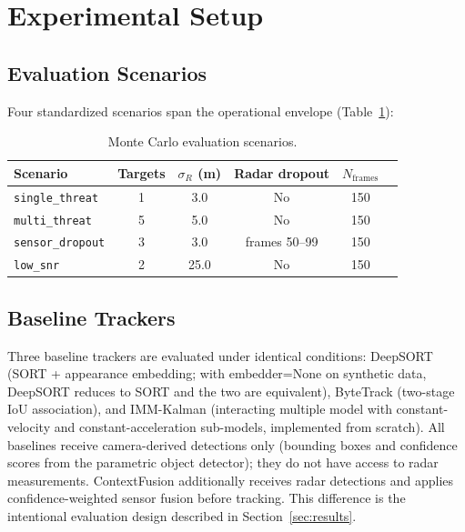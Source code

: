 \documentclass[drones,article,submit,pdftex]{Definitions/mdpi}
\begin{document}
\section{Experimental Setup}
\label{sec:exp}

\subsection{Evaluation Scenarios}

Four standardized scenarios span the operational envelope (Table~\ref{tab:scenarios}):

\begin{table}[ht]
  \centering
  \caption{Monte Carlo evaluation scenarios.}
  \label{tab:scenarios}
  \begin{tabular}{lccccc}
    \toprule
    Scenario & Targets & $\sigma_R$ (m) & Radar dropout & $N_\text{frames}$ \\
    \midrule
    \texttt{single\_threat}  & 1 & 3.0  & No  & 150 \\
    \texttt{multi\_threat}   & 5 & 5.0  & No  & 150 \\
    \texttt{sensor\_dropout} & 3 & 3.0  & frames 50–99 & 150 \\
    \texttt{low\_snr}        & 2 & 25.0 & No  & 150 \\
    \bottomrule
  \end{tabular}
\end{table}

\subsection{Baseline Trackers}

Three baseline trackers are evaluated under identical conditions:
DeepSORT \cite{ref_deepsort} (SORT + appearance embedding; with embedder=None on
synthetic data, DeepSORT reduces to SORT \cite{ref_sort} and the two are equivalent),
ByteTrack \cite{ref_bytetrack} (two-stage IoU association), and
IMM-Kalman (interacting multiple model with constant-velocity and constant-acceleration
sub-models, implemented from scratch).
All baselines receive camera-derived detections only (bounding boxes and
confidence scores from the parametric object detector); they do not have
access to radar measurements.
ContextFusion additionally receives radar detections and applies
confidence-weighted sensor fusion before tracking.
This difference is the intentional evaluation design described in
Section~\ref{sec:results}.
\end{document}
